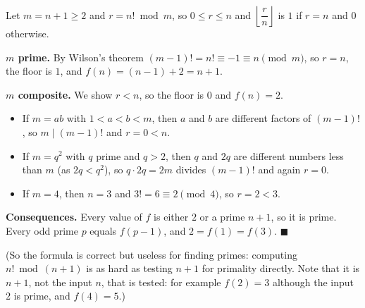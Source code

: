Let $m=n+1\ge2$ and $r=n!\bmod m$, so $0\le r\le n$ and $\left\lfloor\dfrac {r}{n}\right\rfloor$ is $1$ if $r=n$ and $0$ otherwise.

\textbf{$m$ prime.} By Wilson's theorem $(m-1)!=n!\equiv-1\equiv n\pmod m$, so $r=n$, the floor is $1$, and $f(n)=(n-1)+2=n+1$.

\textbf{$m$ composite.} We show $r<n$, so the floor is $0$ and $f(n)=2$.
\begin{itemize}
\item If $m=ab$ with $1<a<b<m$, then $a$ and $b$ are different factors of $(m-1)!$, so $m\mid(m-1)!$ and $r=0<n$.
\item If $m=q^2$ with $q$ prime and $q>2$, then $q$ and $2q$ are different numbers less than $m$ (as $2q<q^2$), so $q\cdot2q=2m$ divides $(m-1)!$ and again $r=0$.
\item If $m=4$, then $n=3$ and $3!=6\equiv2\pmod4$, so $r=2<3$.
\end{itemize}

\textbf{Consequences.} Every value of $f$ is either $2$ or a prime $n+1$, so it is prime. Every odd prime $p$ equals $f(p-1)$, and $2=f(1)=f(3)$. $\blacksquare$

(So the formula is correct but useless for finding primes: computing $n!\bmod(n+1)$ is as hard as testing $n+1$ for primality directly. Note that it is $n+1$, not the input $n$, that is tested: for example $f(2)=3$ although the input $2$ is prime, and $f(4)=5$.)
